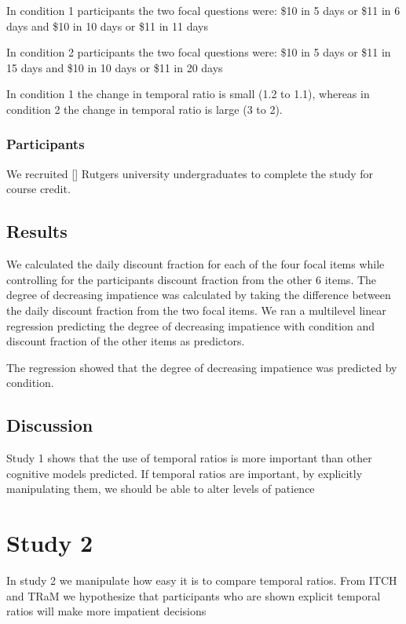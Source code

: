 \documentclass[]{article}
\begin{document}
In condition 1 participants the two focal questions were:  
\$10 in 5 days or \$11 in 6 days
and 
\$10 in 10 days or \$11 in 11 days

In condition 2 participants the two focal questions were: 
\$10 in 5 days or \$11 in 15 days
and 
\$10 in 10 days or \$11 in 20 days

In condition 1 the change in temporal ratio is small (1.2 to 1.1), whereas in condition 2 the change in temporal ratio is large (3 to 2). 


\subsubsection{Participants}

We recruited [] Rutgers university undergraduates to complete the study for course credit. 

\subsection{Results}
 
We calculated the daily discount fraction for each of the four focal items while controlling for the participants discount fraction from the other 6 items. 
The degree of decreasing impatience was calculated by taking the difference between the daily discount fraction from the two focal items. 
We ran a multilevel linear regression predicting the degree of decreasing impatience with condition and discount fraction of the other items as predictors. 

The regression showed that the degree of decreasing impatience was predicted by condition.  

\subsection{Discussion}

Study 1 shows that the use of temporal ratios is more important than other cognitive models predicted. 
If temporal ratios are important, by explicitly manipulating them, we should be able to alter levels of patience

\section{Study 2}

In study 2 we manipulate how easy it is to compare temporal ratios. 
From ITCH and TRaM we hypothesize that participants who are shown explicit temporal ratios will make more impatient decisions 
\end{document}
